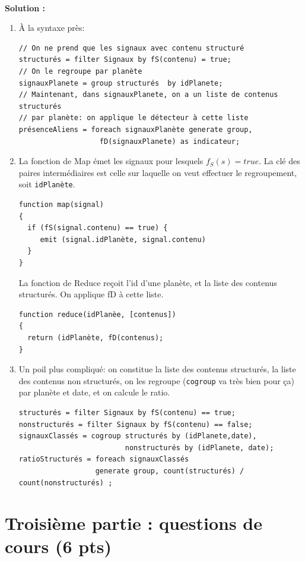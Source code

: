 \documentclass[11pt,a4paper]{article}
\newenvironment{solution}[0]{
~\\ \color{red} \textbf{Solution :}\color{black}}{%
}
\begin{document}
\begin{solution}
\begin{enumerate}
 \item À la syntaxe près:
\begin{verbatim}
// On ne prend que les signaux avec contenu structuré
structurés = filter Signaux by fS(contenu) = true;
// On le regroupe par planète
signauxPlanete = group structurés  by idPlanete;
// Maintenant, dans signauxPlanete, on a un liste de contenus structurés
// par planète: on applique le détecteur à cette liste
présenceAliens = foreach signauxPlanète generate group, 
                   fD(signauxPlanete) as indicateur;
\end{verbatim}

\item La fonction de  Map émet les signaux pour lesquels $f_S(s)=true$. La clé
   des paires intermédiaires est celle sur laquelle on veut effectuer
   le regroupement, soit \texttt{idPlanète}.

\begin{verbatim}
function map(signal)
{
  if (fS(signal.contenu) == true) {
     emit (signal.idPlanète, signal.contenu)
  }
}
\end{verbatim}

La fonction de Reduce reçoit l'id d'une planète, et la liste
des contenus structurés. On applique fD à cette liste.
\begin{verbatim}
function reduce(idPlanèe, [contenus])
{
  return (idPlanète, fD(contenus);
}
\end{verbatim}

\item Un poil plus compliqué: on constitue la liste des contenus structurés,
   la liste des contenus non structurés, on les regroupe (\texttt{cogroup} va
   très bien pour ça) par planète et date, et on calcule le ratio.
   
\begin{verbatim}
structurés = filter Signaux by fS(contenu) == true;
nonstructurés = filter Signaux by fS(contenu) == false;
signauxClassés = cogroup structurés by (idPlanete,date), 
                         nonstructurés by (idPlanete, date);
ratioStructurés = foreach signauxClassés 
                  generate group, count(structurés) / count(nonstructurés) ;
\end{verbatim}
\end{enumerate}
\end{solution}


\section*{Troisième partie : questions de cours (6 pts)}
\end{document}
